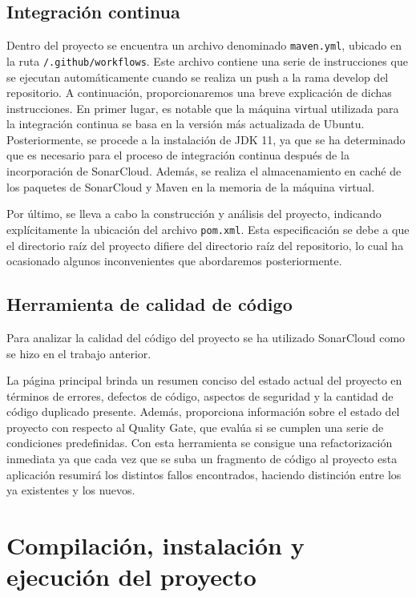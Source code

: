 \subsection{Integración continua}
Dentro del proyecto se encuentra un archivo denominado \texttt{maven.yml}, ubicado en la ruta \texttt{/.github/workflows}. Este archivo contiene una serie de instrucciones que se ejecutan automáticamente cuando se realiza un push a la rama develop del repositorio. A continuación, proporcionaremos una breve explicación de dichas instrucciones. 
En primer lugar, es notable que la máquina virtual utilizada para la integración continua se basa en la versión más actualizada de Ubuntu. Posteriormente, se procede a la instalación de JDK 11, ya que se ha determinado que es necesario para el proceso de integración continua después de la incorporación de SonarCloud. Además, se realiza el almacenamiento en caché de los paquetes de SonarCloud y Maven en la memoria de la máquina virtual.

Por último, se lleva a cabo la construcción y análisis del proyecto, indicando explícitamente la ubicación del archivo \texttt{pom.xml}. Esta especificación se debe a que el directorio raíz del proyecto difiere del directorio raíz del repositorio, lo cual ha ocasionado algunos inconvenientes que abordaremos posteriormente.
\subsection{Herramienta de calidad de código}
Para analizar la calidad del código del proyecto se ha utilizado SonarCloud como se hizo en el trabajo anterior.

La página principal brinda un resumen conciso del estado actual del proyecto en términos de errores, defectos de código, aspectos de seguridad y la cantidad de código duplicado presente. Además, proporciona información sobre el estado del proyecto con respecto al Quality Gate, que evalúa si se cumplen una serie de condiciones predefinidas.
Con esta herramienta se consigue una refactorización inmediata ya que cada vez que se suba un fragmento de código al proyecto esta aplicación resumirá los distintos fallos encontrados, haciendo distinción entre los ya existentes y los nuevos.

\section{Compilación, instalación y ejecución del proyecto}
